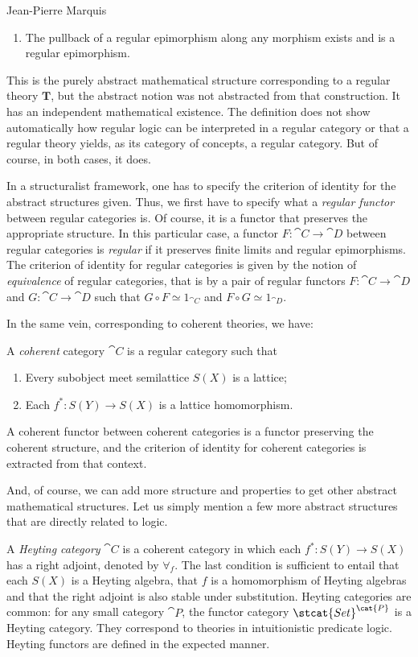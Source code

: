 \begin{artengenv}{Jean-Pierre Marquis}
\begin{enumerate}
	\item The pullback of a regular epimorphism along any morphism exists and is a regular epimorphism.
\end{enumerate}
This is the purely abstract mathematical structure corresponding to a regular theory \( \mathbf{T}\), but the abstract notion was not abstracted from that construction. It has an independent mathematical existence. The definition does not show automatically how regular logic can be interpreted in a regular category or that a regular theory yields, as its category of concepts, a regular category. But of course, in both cases, it does. 

In a structuralist framework, one has to specify the criterion of identity for the abstract structures given. Thus, we first have to specify what a \emph{regular functor} between regular categories is. Of course, it is a functor that preserves the appropriate structure. In this particular case, a functor $F : \cat{C} \to \cat{D}$ between regular categories is \emph{regular}  if it preserves finite limits and regular epimorphisms. The criterion of identity for regular categories is given by the notion of \emph{equivalence} of regular categories, that is by a pair of regular functors $F : \cat{C} \to \cat{D}$ and $G : \cat{C} \to \cat{D}$ such that $G \circ F \simeq 1_{\cat{C}}$ and $F \circ G \simeq 1_{\cat{D}}$. 

In the same vein, corresponding to coherent theories, we have:

A \textit{coherent} category \( \cat{C} \) is a regular category such that
%
\begin{enumerate}

\item Every subobject meet semilattice \( S(X) \) is a lattice;

\item Each \( f^{\ast}\colon S(Y) \rightarrow S(X) \) is a lattice homomorphism.
\end{enumerate}
A coherent functor between coherent categories is a functor preserving the coherent structure, and the criterion of identity for coherent categories is extracted from that context. 

And, of course, we can add more structure and properties to get other abstract mathematical structures. Let us simply mention a few more abstract structures that are directly related to logic.

A \textit{Heyting category} \( \cat{C} \) is a coherent category in which each \( f^{\ast}\colon S(Y) \rightarrow S(X) \) has a right adjoint, denoted by \( \forall_f \). The last condition is sufficient to entail that each \( S(X) \) is a Heyting algebra, that \( f \) is a homomorphism of Heyting 
algebras and that the right adjoint is also stable under substitution. Heyting categories are common: for any small category \( \cat{P} \), the functor category \( \stcat{Set}^{\cat{P}} \) is a Heyting category. They correspond to theories in intuitionistic predicate logic. Heyting functors are defined in the expected manner.


\end{artengenv}
